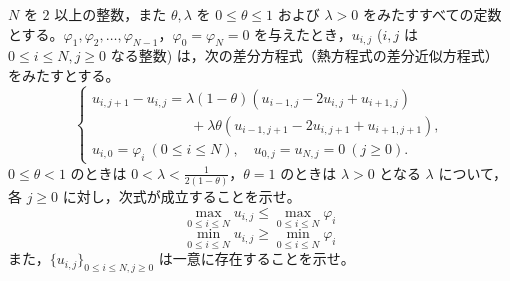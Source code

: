 \documentclass[12pt]{jlreq}
\begin{document}
$N$ を $2$ 以上の整数，また $\theta, \lambda$ を $0 \le \theta \le 1$ および $\lambda > 0$ をみたすすべての定数とする。$\varphi_1, \varphi_2, \dots, \varphi_{N-1}$，$\varphi_0 = \varphi_N = 0$ を与えたとき，$u_{i,j}$ ($i, j$ は $0 \le i \le N, j \ge 0$ なる整数) は，次の差分方程式（熱方程式の差分近似方程式）をみたすとする。
\[
  \begin{cases} u_{i,j+1} - u_{i,j} = \lambda(1-\theta)(u_{i-1,j} - 2u_{i,j} + u_{i+1,j}) \\ \quad\quad\quad\quad\quad\quad\quad + \lambda\theta(u_{i-1,j+1} - 2u_{i,j+1} + u_{i+1,j+1}), \\ u_{i,0} = \varphi_i \ (0 \le i \le N),\quad u_{0,j} = u_{N,j} = 0 \ (j \ge 0). \end{cases}
\]
$0 \le \theta < 1$ のときは $0 < \lambda < \frac{1}{2(1-\theta)}$，$\theta = 1$ のときは $\lambda > 0$ となる $\lambda$ について，各 $j \ge 0$ に対し，次式が成立することを示せ。
\[
  \max_{0 \le i \le N} u_{i,j} \le \max_{0 \le i \le N} \varphi_i
\]
\[
  \min_{0 \le i \le N} u_{i,j} \ge \min_{0 \le i \le N} \varphi_i
\]
また，$\{u_{i,j}\}_{0 \le i \le N, j \ge 0}$ は一意に存在することを示せ。
\end{document}
